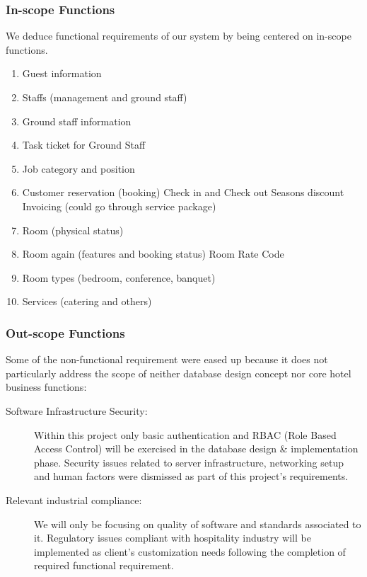 \subsubsection{In-scope Functions}

We deduce functional requirements of our system by being centered on in-scope functions. \cite{fulton2017requirements}

\begin{enumerate}
	\item Guest information
	\item Staffs (management and ground staff)
		\item Ground staff information
		\item Task ticket for Ground Staff
	\item Job category and position
	\item Customer reservation (booking)
			\subitem Check in and Check out
			\subitem Seasons discount
			\subitem Invoicing (could go through service package)
	\item Room (physical status)
	\item Room again (features and booking status)
		\subitem Room Rate Code
	\item Room types (bedroom, conference, banquet)
	\item Services (catering and others)
\end{enumerate}

\subsubsection{Out-scope Functions}

Some of the non-functional requirement were eased up because it does not particularly address the scope of neither database design concept nor core hotel business functions:

\begin{description}
	\item[Software Infrastructure Security:] Within this project only basic authentication and RBAC (Role Based Access Control) will be exercised in the database design \& implementation phase. Security issues related to server infrastructure, networking setup and human factors were dismissed as part of this project's requirements.
	\item[Relevant industrial compliance:] We will only be focusing on quality of software and standards associated to it. Regulatory issues compliant with hospitality industry will be implemented as client's customization needs following the completion of required functional requirement.
\end{description}

